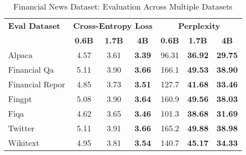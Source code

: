 
\begin{table}[h]
\centering
\caption[Financial News: Evaluation Results]{Financial News Dataset: Evaluation Across Multiple Datasets}
\label{tab:news_articles_results}
\begin{tabular}{l|ccc|ccc}
\hline
\textbf{Eval Dataset} & \multicolumn{3}{c|}{\textbf{Cross-Entropy Loss}} & \multicolumn{3}{c}{\textbf{Perplexity}} \\
\cline{2-4} \cline{5-7}
  & \textbf{0.6B} & \textbf{1.7B} & \textbf{4B} & \textbf{0.6B} & \textbf{1.7B} & \textbf{4B} \\
Alpaca & 4.57 & 3.61 & \textbf{3.39} & 96.31 & \textbf{36.92} & \textbf{29.75} \\
Financial Qa & 5.11 & 3.90 & \textbf{3.66} & 166.1 & \textbf{49.53} & \textbf{38.90} \\
Financial Repor & 4.85 & 3.73 & \textbf{3.51} & 127.7 & \textbf{41.68} & \textbf{33.46} \\
Fingpt & 5.08 & 3.90 & \textbf{3.64} & 160.9 & \textbf{49.56} & \textbf{38.03} \\
Fiqa & 4.62 & 3.65 & \textbf{3.46} & 101.3 & \textbf{38.68} & \textbf{31.69} \\
Twitter & 5.11 & 3.91 & \textbf{3.66} & 165.2 & \textbf{49.88} & \textbf{38.98} \\
Wikitext & 4.95 & 3.81 & \textbf{3.54} & 140.7 & \textbf{45.17} & \textbf{34.33} \\
\hline
\end{tabular}
\end{table}

